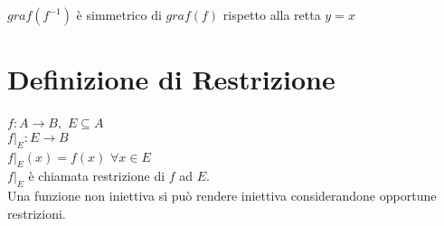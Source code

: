 \documentclass[a4paper, twoside, italian, 11pt]{book}
\begin{document}
\noindent
$graf(f^{-1})$ è simmetrico di $graf(f)$ rispetto alla retta $y = x$



\section{Definizione di Restrizione}

\noindent
$f : A \rightarrow B,$ $E \subseteq A$ \\

\noindent
$f|_E : E \rightarrow B$ \\
$f|_E(x) = f(x)$ $\forall x \in E$ \\

\noindent
$f|_E$ è chiamata restrizione di $f$ ad $E$. \\

\noindent
Una funzione non iniettiva si può rendere iniettiva considerandone opportune restrizioni. %
\end{document}

